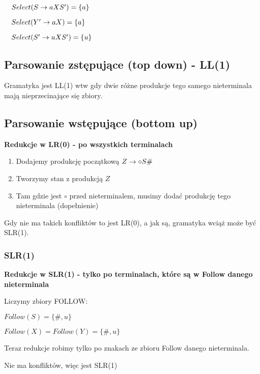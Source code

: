 $\quad Select(S \rightarrow aXS') = \{ a \}$

$\quad Select(Y' \rightarrow aX) = \{ a \}$

$\quad Select(S' \rightarrow uXS') = \{ u \}$

\subsection{Parsowanie zstępujące (top down) - LL(1)}
Gramatyka jest LL(1) wtw gdy dwie różne produkcje tego samego nieterminala mają nieprzecinające się zbiory.

\subsection{Parsowanie wstępujące (bottom up)}

\textbf{Redukcje w LR(0) - po wszystkich terminalach}

\begin{enumerate}
    \item Dodajemy produkcję początkową $Z \rightarrow \circ S\#$
    \item Tworzymy stan z produkcją $Z$
    \item Tam gdzie jest $\circ$ przed nieterminalem, musimy dodać produkcję tego nieterminala (dopełnienie)
\end{enumerate}

\begin{figure}[H]

\end{figure}

Gdy nie ma takich konfliktów to jest LR(0), a jak są, gramatyka wciąż może być SLR(1).

\subsubsection{SLR(1)}

\textbf{Redukcje w SLR(1) - tylko po terminalach, które są w Follow danego nieterminala}

Liczymy zbiory FOLLOW:

$Follow(S) = \{\#, u\}$

$Follow(X) = Follow(Y) = \{\#, u\}$

Teraz redukcje robimy tylko po znakach ze zbioru Follow danego nieterminala.

\begin{figure}[H]

\end{figure}

Nie ma konfliktów, więc jest SLR(1)


